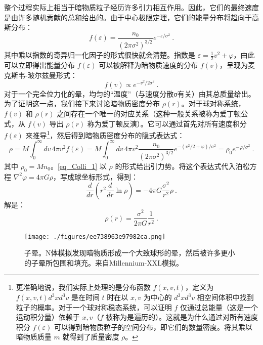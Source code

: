 整个过程实际上相当于暗物质粒子经历许多引力相互作用。因此，它们的最终速度是由许多随机贡献的总和给出的。由于中心极限定理，它们的能量分布将趋向于高斯分布：
\begin{equation}
 f(\varepsilon) =   \frac{n_0}{(2\pi\sigma^2)^{3/2}}  e^{-\varepsilon/\sigma^2} ~. 
\end{equation}
其中乘以指数的奇异归一化因子的形式很快就会清楚。指数是 \(\varepsilon = \frac{1}{2}v^2 + \varphi\)，由此可以立即得出能量分布 \(f(\varepsilon)\) 可以被解释为暗物质速度的分布 \(f(v)\)，呈现为麦克斯韦-玻尔兹曼形式：
\begin{equation}
 f(v) \propto e^{-v^2/2\sigma^2}~. 
\end{equation}
对于一个完全位力化的晕，均匀的“温度”（与速度分散σ有关）由其总质量给出。为了证明这一点，我们接下来讨论暗物质密度分布 \(\rho(r)\)。对于球对称系统，\(f(v)\) 和 \(\rho(r)\) 之间存在一个唯一的对应关系（这种一般关系被称为爱丁顿公式，从 \(f(v)\) 导出 \(\rho(r)\) 称为爱丁顿反演）。它可以通过首先对所有速度积分 \(f(\varepsilon)\) 来推导\footnote{更准确地说，我们实际上处理的是分布函数 \(f(x, v, t)\)，定义为 \(f(x, v, t) d^3x d^3v\) 是在时间 \(t\) 时在以 \(x, v\) 为中心的 $d^3x d^3v$ 相空间体积中找到粒子的概率。对于一个球对称稳态系统，可以证明 \(f\) 仅通过总能量（这是一个运动积分量）依赖于 \(x, v\)（\(f\) 被称为是遍历的）。这就是为什么通过对所有速度积分 \(f(\varepsilon)\) 可以得到暗物质粒子的空间分布，即它们的数量密度。将其乘以暗物质质量 \(m\) 就得到了质量密度 \(\rho\)。}，然后得到暗物质密度分布的隐式表达式：
\begin{equation}\label{eq_Colli_1}
 \rho = M \int_0^\infty dv \, 4\pi v^2 f(\varepsilon) = M \int_0^\infty dv \, 4\pi v^2 \frac{n_0}{(2\pi\sigma^2)^{3/2}} e^{-(v^2/2+\varphi)/\sigma^2} = \rho_0 e^{-\varphi/\sigma^2}~. 
\end{equation}
其中 \(\rho_0 = Mn_0\)。\autoref{eq_Colli_1} 以 \(\rho\) 的形式给出引力势。将这个表达式代入泊松方程 \(\nabla^2\varphi = 4\pi G\rho\)，写成球坐标形式，得到：
\begin{equation}
 \frac{d}{dr} \left( r^2 \frac{d}{dr} \ln\rho \right) = -4\pi G \frac{\sigma^2}{r^2} \rho~. 
\end{equation}
解是：
\begin{equation}
\rho(r) = \frac{\sigma^2}{2\pi G} \frac{1}{r^2}~. 
\end{equation}

\begin{figure}[ht]
\centering
\texttt{[image: ./figures/ee738963e97982ca.png]}
\caption{子晕。N体模拟发现暗物质形成一个大致球形的晕，然后被许多更小的子晕所包围和填充。来自Millennium-XXL模拟。} \label{fig_Colli_2}
\end{figure}

